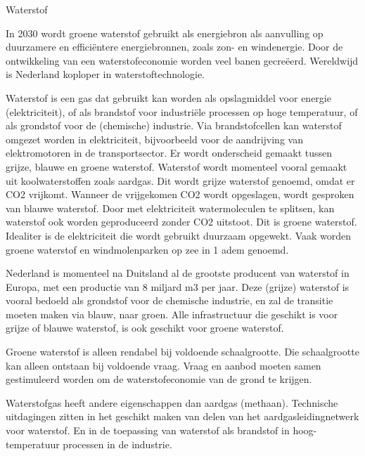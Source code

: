 \begin{voorstel}{Waterstof}


\begin{samenvatting}
In 2030 wordt groene waterstof gebruikt als energiebron als aanvulling op duurzamere en efficiëntere energiebronnen, zoals zon- en windenergie. Door de ontwikkeling van een waterstofeconomie worden veel banen gecreëerd. Wereldwijd is Nederland koploper in waterstoftechnologie.
\end{samenvatting}

\begin{uitdaging}
Waterstof is een gas dat gebruikt kan worden als opslagmiddel voor energie (elektriciteit), of als brandstof voor industriële processen op hoge temperatuur, of als grondstof voor de (chemische) industrie. Via brandstofcellen kan waterstof omgezet worden in elektriciteit, bijvoorbeeld voor de aandrijving van elektromotoren in de transportsector. 
Er wordt onderscheid gemaakt tussen grijze, blauwe en groene waterstof. Waterstof wordt momenteel vooral gemaakt uit koolwaterstoffen zoals aardgas. Dit wordt grijze waterstof genoemd, omdat er  CO2 vrijkomt. Wanneer de vrijgekomen CO2 wordt opgeslagen, wordt gesproken van blauwe waterstof. Door met elektriciteit watermoleculen te splitsen, kan waterstof ook worden geproduceerd zonder CO2 uitstoot. Dit is groene waterstof. Idealiter is de elektriciteit die wordt gebruikt duurzaam opgewekt. Vaak worden groene waterstof en windmolenparken op zee in 1 adem genoemd.

Nederland is momenteel na Duitsland al de grootste producent van waterstof in Europa, met een productie van 8 miljard m3 per jaar. Deze (grijze) waterstof is vooral bedoeld als grondstof voor de chemische industrie, en zal de transitie moeten maken via blauw, naar groen. Alle infrastructuur die geschikt is voor grijze of blauwe waterstof, is ook geschikt voor groene waterstof.

Groene waterstof is alleen rendabel bij voldoende schaalgrootte. Die schaalgrootte kan alleen ontstaan bij voldoende vraag. Vraag en aanbod moeten samen gestimuleerd worden om de waterstofeconomie van de grond te krijgen.

Waterstofgas heeft andere eigenschappen dan aardgas (methaan). Technische uitdagingen zitten in het geschikt maken van delen van het aardgasleidingnetwerk voor waterstof. En in de toepassing van waterstof als brandstof in hoog-temperatuur processen in de industrie.
\end{uitdaging}


\end{voorstel}
